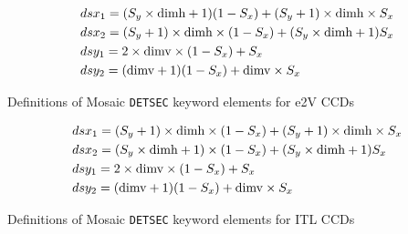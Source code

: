 \documentclass{article}[12pt]
\begin{document}
\begin{table}
\begin{align*}
& dsx_1 = (S_y \times {\rm dimh} + 1)(1 - S_x) + (S_y + 1) \times {\rm dimh} \times S_x  \\
& dsx_2 = (S_y +1)  \times {\rm dimh} \times (1 - S_x) + (S_y \times {\rm dimh} + 1) S_x \\
& dsy_1 = 2 \times {\rm dimv} \times (1 - S_x) +  S_x \\
& dsy_2 = ({\rm dimv} + 1)(1 - S_x) + {\rm dimv}  \times S_x \\ 
\end{align*}
\caption{Definitions of Mosaic {\tt DETSEC} keyword elements for e2V CCDs\label{tab:detsece2v}}
\end{table}

\begin{table}
\begin{align*}
& dsx_1 = (S_y +1) \times {\rm dimh} \times (1 - S_x) + (S_y + 1) \times {\rm dimh} \times S_x  \\
& dsx_2 = (S_y  \times {\rm dimh} + 1) \times (1 - S_x) + (S_y \times {\rm dimh} + 1) S_x \\
& dsy_1 = 2 \times {\rm dimv} \times (1 - S_x) +  S_x \\
& dsy_2 = ({\rm dimv} + 1)(1 - S_x) + {\rm dimv}  \times S_x \\ 
\end{align*}
\caption{Definitions of Mosaic {\tt DETSEC} keyword elements for ITL CCDs\label{tab:detsecitl}}
\end{table}

%    
    
\end{document}
